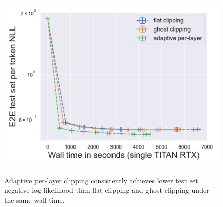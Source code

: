 \begin{figure}[htb]
\begin{center}
\begin{minipage}[t]{0.5\linewidth}
\centering
{\includegraphics[width=0.95\linewidth]{files/fig/walltime_e2e_test_nll.pdf}} \end{minipage}
\end{center}
\caption{
Adaptive per-layer clipping consistently achieves lower test set negative log-likelihood than flat clipping and ghost clipping under the same wall time.
}
\label{fig:gpt2runtime-overall-nll}
\end{figure}

